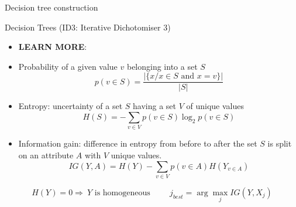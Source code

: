 \documentclass{KBook}
\begin{document}
	\begin{block}{Decision tree construction}
		\scriptsize
		\begin{algorithm}[H]
			
			\Return {}\;
			
			
		\end{algorithm}
	\end{block}
	
	Decision Trees (ID3: Iterative Dichotomiser 3)
	
	\begin{itemize}
		\item \textbf{LEARN MORE}: \cite{1986-quinlan}
		\item Probability of a given value $ v $ belonging into a set $ S $
		\[p(v\in S) = \frac{|\{x / x\in S \text{ and } x = v\}|}{|S|}\]
		\item Entropy: uncertainty of a set $ S $ having a set $ V $ of unique values
		\[H(S) = - \sum\limits_{v \in V} p(v\in S) \log_2 p(v\in S)\]
		\item Information gain: difference in entropy from before to after the set $ S $ is split on an attribute $ A $ with $ V $ unique values.
		\[IG(Y, A) = H(Y) - \sum_{v \in V} p(v\in A) H(Y_{v\in A})\] 
	\end{itemize}
	
	\[H(Y) = 0 \Rightarrow\ Y \text{ is homogeneous} \hspace{1cm} j_{best} = \arg\max_j IG(Y, X_j)\]
	
\end{document}
